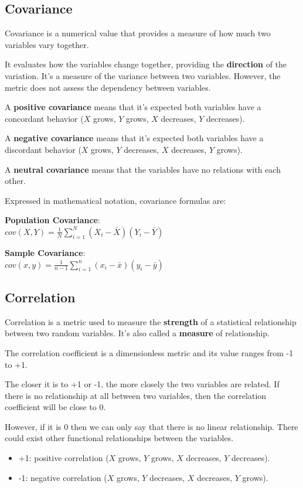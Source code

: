 \documentclass{article}
\begin{document}
\subsection{Covariance}
Covariance is a numerical value that provides a measure of how much two variables vary together.

It evaluates how the variables change together, providing the \textbf{direction} of the variation. 
It’s a measure of the variance between two variables. However, the metric does not assess the dependency between variables.

A \textbf{positive covariance} means that it’s expected both variables have a concordant behavior ($X$ grows, $Y$ grows, $X$ decreases, $Y$ decreases).

A \textbf{negative covariance} means that it’s expected both variables have a discordant behavior 
($X$ grows, $Y$ decreases, $X$ decreases, $Y$ grows).

A \textbf{neutral covariance} means that the variables have no relations with each other.

Expressed in mathematical notation, covariance formulas are:

\textbf{Population Covariance}: \\ 
$\displaystyle cov(X, Y) = \frac{1}{N}\sum \limits_{i=1}^N (X_i - \bar{X})(Y_i - \bar{Y})$

\textbf{Sample Covariance}: \\ 
$\displaystyle cov(x, y) = \frac{1}{n-1}\sum \limits_{i=1}^n (x_i - \bar{x})(y_i - \bar{y})$

\subsection{Correlation}
Correlation is a metric used to measure the \textbf{strength} of a  statistical relationship between two random variables. It’s also called a \textbf{measure} of relationship.

The correlation coefficient is a dimensionless metric and its value ranges from -1 to +1. 

The closer it is to +1 or -1, the more closely the two variables are related. 
If there is no relationship at all between two variables, then the correlation coefficient will be close to 0. 

However, if it is 0 then we can only say that there is no linear relationship. There could exist other functional relationships between the variables.

\begin{itemize}
    \item +1: positive correlation ($X$ grows, $Y$ grows, $X$ decreases, $Y$ decreases).
    \item -1: negative correlation ($X$ grows, $Y$ decreases, $X$ decreases, $Y$ grows).
\end{itemize}
\end{document}
